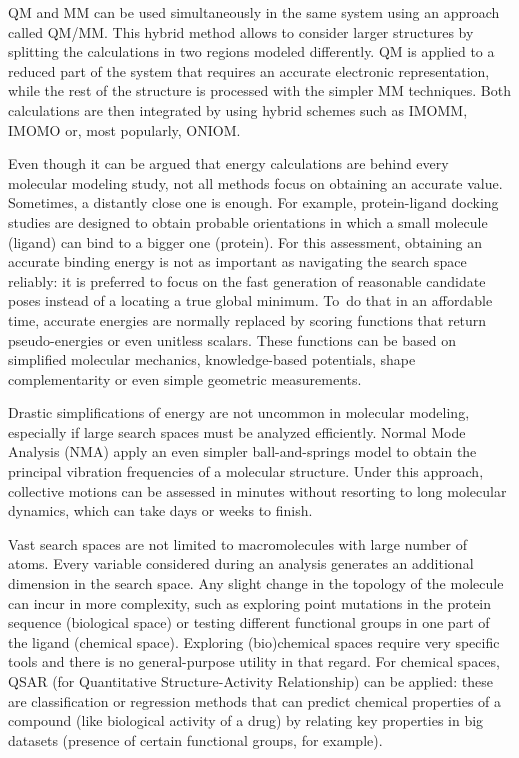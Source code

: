 QM and MM can be used simultaneously in the same system using an approach called QM/MM. This hybrid method allows to consider larger structures by splitting the calculations in two regions modeled differently. QM is applied to a reduced part of the system that requires an accurate electronic representation, while the rest of the structure is processed with the simpler MM techniques. Both calculations are then integrated by using hybrid schemes such as IMOMM,\cite{maseras1995imomm} IMOMO\cite{humbel1996imomo} or, most popularly, ONIOM.\cite{svensson1996oniom}

Even though it can be argued that energy calculations are behind every molecular modeling study, not all methods focus on obtaining an accurate value. Sometimes, a distantly close one is enough. For example, protein-ligand docking studies are designed to obtain probable orientations in which a small molecule (ligand) can bind to a bigger one (protein). For this assessment, obtaining an accurate binding energy is not as important as navigating the search space reliably: it is preferred to focus on the fast generation of reasonable candidate poses instead of a locating a true global minimum. To\ do that in an affordable time, accurate energies are normally replaced by scoring functions that return pseudo-energies or even unitless scalars. These functions can be based on simplified molecular mechanics, knowledge-based potentials, shape complementarity or even simple geometric measurements.

Drastic simplifications of energy are not uncommon in molecular modeling, especially if large search spaces must be analyzed efficiently. Normal Mode Analysis (NMA) apply an even simpler ball-and-springs model to obtain the principal vibration frequencies of a molecular structure. Under this approach, collective motions can be assessed in minutes without resorting to long molecular dynamics, which can take days or weeks to finish.

Vast search spaces are not limited to macromolecules with large number of atoms. Every variable considered during an analysis generates an additional dimension in the search space. Any slight change in the topology of the molecule can incur in more complexity, such as exploring point mutations in the protein sequence (biological space) or testing different functional groups in one part of the ligand (chemical space). Exploring (bio)chemical spaces require very specific tools and there is no general-purpose utility in that regard. For chemical spaces, QSAR (for Quantitative Structure-Activity Relationship) can be applied: these are classification or regression methods that can predict chemical properties of a compound (like biological activity of a drug) by relating key properties in big datasets (presence of certain functional groups, for example).

